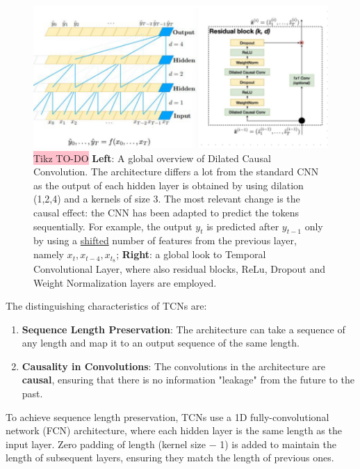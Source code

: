 \begin{figure}[!htbp]
    \centering
    \includegraphics[width=\linewidth]{tikz/TCN.png}
    \caption{{\color{red}\colorbox{pink}{Tikz TO-DO}} \textbf{Left}: A global overview of Dilated Causal Convolution. The architecture differs a lot from the standard CNN as the output of each hidden layer is obtained by using dilation (1,2,4) and a kernels of size 3. The most relevant change is the causal effect: the CNN has been adapted to predict the tokens sequentially. For example, the output $y_t$ is predicted after $y_{t-1}$ only by using a \underline{shifted} number of features from the previous layer, namely $x_t, x_{t-4}, x_{t_8}$; \textbf{Right}: a global look to Temporal Convolutional Layer, where also residual blocks, ReLu, Dropout and Weight Normalization layers are employed.}
    \label{fig:TCN}
\end{figure}



The distinguishing characteristics of TCNs are:
\begin{enumerate}
    \item \textbf{Sequence Length Preservation}: The architecture can take a sequence of any length and map it to an output sequence of the same length.
    
    \vspace{1 pt}
    \item \textbf{Causality in Convolutions}: The convolutions in the architecture are \textbf{causal}, ensuring that there is no information "leakage" from the future to the past.
\end{enumerate}

To achieve sequence length preservation, TCNs use a 1D fully-convolutional network (FCN) architecture, where each hidden layer is the same length as the input layer. Zero padding of length (kernel size − 1) is added to maintain the length of subsequent layers, ensuring they match the length of previous ones.


